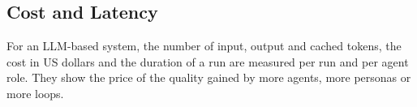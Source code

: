 \subsection{Cost and Latency}
\label{sec:bg-metrics-cost}

For an LLM-based system, the number of input, output and cached tokens, the cost in US dollars and the duration of a run are measured per run and per agent role. They show the price of the quality gained by more agents, more personas or more loops.
